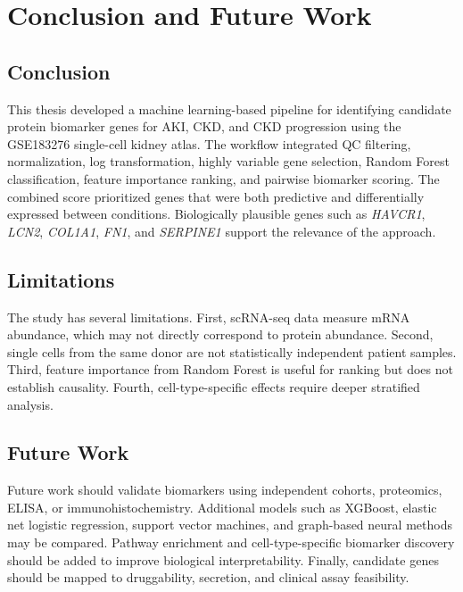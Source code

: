 \chapter{Conclusion and Future Work}
\section{Conclusion}
This thesis developed a machine learning-based pipeline for identifying candidate protein biomarker genes for AKI, CKD, and CKD progression using the GSE183276 single-cell kidney atlas. The workflow integrated QC filtering, normalization, log transformation, highly variable gene selection, Random Forest classification, feature importance ranking, and pairwise biomarker scoring. The combined score prioritized genes that were both predictive and differentially expressed between conditions. Biologically plausible genes such as \textit{HAVCR1}, \textit{LCN2}, \textit{COL1A1}, \textit{FN1}, and \textit{SERPINE1} support the relevance of the approach.

\section{Limitations}
The study has several limitations. First, scRNA-seq data measure mRNA abundance, which may not directly correspond to protein abundance. Second, single cells from the same donor are not statistically independent patient samples. Third, feature importance from Random Forest is useful for ranking but does not establish causality. Fourth, cell-type-specific effects require deeper stratified analysis.

\section{Future Work}
Future work should validate biomarkers using independent cohorts, proteomics, ELISA, or immunohistochemistry. Additional models such as XGBoost, elastic net logistic regression, support vector machines, and graph-based neural methods may be compared. Pathway enrichment and cell-type-specific biomarker discovery should be added to improve biological interpretability. Finally, candidate genes should be mapped to druggability, secretion, and clinical assay feasibility.
